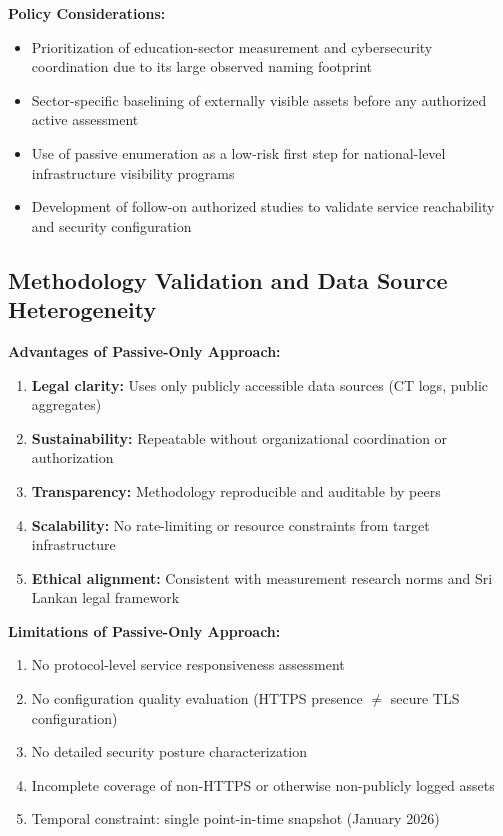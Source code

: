 \documentclass[preprint,review,12pt]{elsarticle}
\begin{document}
\textbf{Policy Considerations:}
\begin{itemize}
    \item Prioritization of education-sector measurement and cybersecurity coordination due to its large observed naming footprint
    \item Sector-specific baselining of externally visible assets before any authorized active assessment
    \item Use of passive enumeration as a low-risk first step for national-level infrastructure visibility programs
    \item Development of follow-on authorized studies to validate service reachability and security configuration
\end{itemize}

\subsection{Methodology Validation and Data Source Heterogeneity}

\textbf{Advantages of Passive-Only Approach:}
\begin{enumerate}
    \item \textbf{Legal clarity:} Uses only publicly accessible data sources (CT logs, public aggregates)
    \item \textbf{Sustainability:} Repeatable without organizational coordination or authorization
    \item \textbf{Transparency:} Methodology reproducible and auditable by peers
    \item \textbf{Scalability:} No rate-limiting or resource constraints from target infrastructure
    \item \textbf{Ethical alignment:} Consistent with measurement research norms and Sri Lankan legal framework
\end{enumerate}

\textbf{Limitations of Passive-Only Approach:}
\begin{enumerate}
    \item No protocol-level service responsiveness assessment
    \item No configuration quality evaluation (HTTPS presence $\neq$ secure TLS configuration)
    \item No detailed security posture characterization
    \item Incomplete coverage of non-HTTPS or otherwise non-publicly logged assets
    \item Temporal constraint: single point-in-time snapshot (January 2026)
\end{enumerate}
\end{document}
